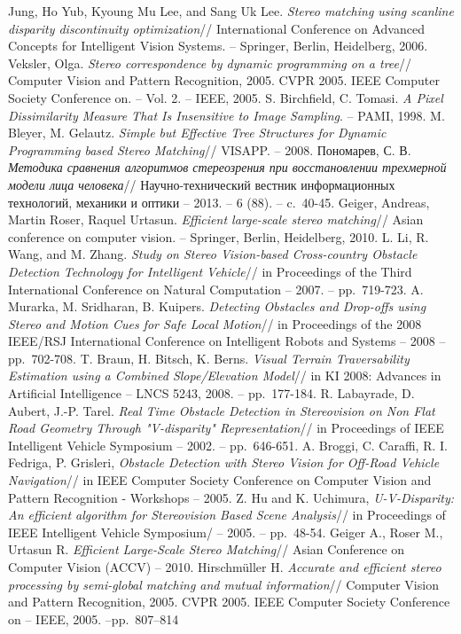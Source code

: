 \documentclass[oneside,final,12pt]{scrartcl}
\begin{document}
\begin{thebibliography}{00}
	   		 Jung, Ho Yub, Kyoung Mu Lee, and Sang Uk Lee. \emph{Stereo matching using scanline disparity discontinuity optimization}// International Conference on Advanced Concepts for Intelligent Vision Systems. -- Springer, Berlin, Heidelberg, 2006.
	   	 Veksler, Olga. \emph{Stereo correspondence by dynamic programming on a tree}// Computer Vision and Pattern Recognition, 2005. CVPR 2005. IEEE Computer Society Conference on. -- Vol. 2. -- IEEE, 2005.
	   		 S. Birchfield, C. Tomasi. \emph{A Pixel Dissimilarity Measure That Is Insensitive to Image Sampling}. -- PAMI, 1998.
	  	 M. Bleyer, M. Gelautz. \emph{Simple but Effective Tree Structures for Dynamic Programming based Stereo Matching}// VISAPP. -- 2008.
	  		 Пономарев, С. В. \emph{Методика сравнения алгоритмов стереозрения при восстановлении трехмерной модели лица человека}// Научно-технический вестник информационных технологий, механики и оптики -- 2013. -- 6 (88). -- c.~40-45.
	  	 Geiger, Andreas, Martin Roser, Raquel Urtasun. \emph{Efficient large-scale stereo matching}// Asian conference on computer vision. -- Springer, Berlin, Heidelberg, 2010.
	  		 		 L. Li, R. Wang, and M. Zhang. \emph{Study on Stereo Vision-based Cross-country Obstacle Detection Technology for Intelligent Vehicle}// in Proceedings of the Third International Conference on Natural Computation -- 2007. -- pp.~719-723.
	  	 A. Murarka, M. Sridharan, B. Kuipers. \emph{Detecting Obstacles and Drop-offs using Stereo and Motion Cues for Safe Local Motion}// in Proceedings of the 2008 IEEE/RSJ International Conference on Intelligent Robots and Systems -- 2008 -- pp.~702-708.
	  		 T. Braun, H. Bitsch, K. Berns. \emph{Visual Terrain Traversability Estimation using a Combined Slope/Elevation Model}// in KI 2008: Advances in Artificial Intelligence -- LNCS 5243, 2008. -- pp.~177-184.
	  	 R. Labayrade, D. Aubert, J.-P. Tarel. \emph{Real Time Obstacle Detection in Stereovision on Non Flat Road Geometry Through "V-disparity" Representation}// in Proceedings of IEEE Intelligent Vehicle Symposium -- 2002. -- pp.~646-651.
	  		 A. Broggi, C. Caraffi, R. I. Fedriga, P. Grisleri, \emph{Obstacle Detection with Stereo Vision for Off-Road Vehicle Navigation}// in IEEE Computer Society Conference on Computer Vision and Pattern Recognition - Workshops -- 2005.
	  	 Z. Hu and K. Uchimura, \emph{U-V-Disparity: An efficient algorithm for Stereovision Based Scene Analysis}// in Proceedings of IEEE Intelligent Vehicle Symposium/ -- 2005. -- pp.~48-54.
	  		 Geiger A., Roser M., Urtasun R. \emph{Efficient Large-Scale Stereo Matching}// Asian Conference on Computer Vision (ACCV) -- 2010.
	  	 Hirschmüller H. \emph{Accurate and efficient stereo processing by semi-global matching and mutual information}// Computer Vision and Pattern Recognition, 2005. CVPR 2005. IEEE Computer Society Conference on  -- IEEE, 2005. --pp.~807–814
	\end{thebibliography}
\end{document}
